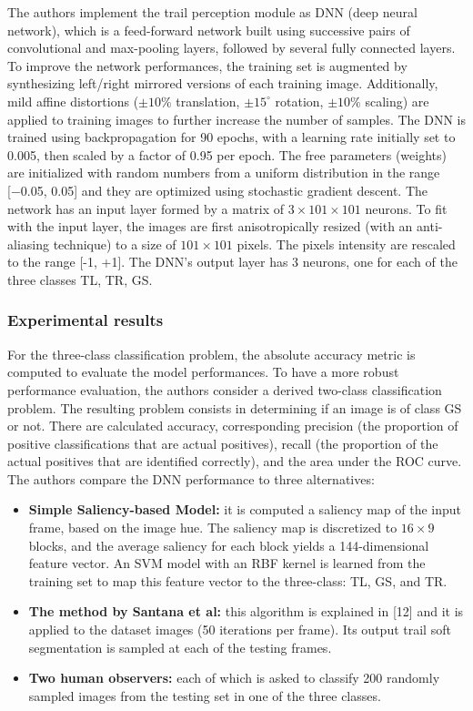 The authors implement the trail perception module as DNN (deep neural
network), which is a feed-forward network built using successive pairs
of convolutional and max-pooling layers, followed by several fully
connected layers. To improve the network performances, the training set
is augmented by synthesizing left/right mirrored versions of each
training image. Additionally, mild affine distortions ($\pm10\%$
translation, $\pm15^{\circ}$ rotation, $\pm10\%$ scaling) are applied to training
images to further increase the number of samples. The DNN is trained
using backpropagation for 90 epochs, with a learning rate initially set
to 0.005, then scaled by a factor of 0.95 per epoch. The free parameters
(weights) are initialized with random numbers from a uniform
distribution in the range {[}−0.05, 0.05{]} and they are optimized using
stochastic gradient descent. The network has an input layer formed by a
matrix of $3 \times 101 \times 101$ neurons. To fit with the input layer, the images
are first anisotropically resized (with an anti-aliasing technique) to a
size of $101 \times 101$ pixels. The pixels intensity are rescaled to the range
{[}-1, +1{]}. The DNN's output layer has 3 neurons, one for each of the
three classes TL, TR, GS.

\subsubsection{Experimental results}\label{header-n72}

For the three-class classification problem, the absolute accuracy metric
is computed to evaluate the model performances. To have a more robust
performance evaluation, the authors consider a derived two-class
classification problem. The resulting problem consists in determining if
an image is of class GS or not. There are calculated accuracy,
corresponding precision (the proportion of positive classifications that
are actual positives), recall (the proportion of the actual positives
that are identified correctly), and the area under the ROC curve. The
authors compare the DNN performance to three alternatives:

\begin{itemize}
\item
  \textbf{Simple Saliency-based Model:} it is computed a saliency map of
  the input frame, based on the image hue. The saliency map is
  discretized to $16 \times 9$ blocks, and the average saliency for each block
  yields a 144-dimensional feature vector. An SVM model with an RBF
  kernel is learned from the training set to map this feature vector to
  the three-class: TL, GS, and TR.
\item
  \textbf{The method by Santana et al:} this algorithm is explained in
  {[}12{]} and it is applied to the dataset images (50 iterations per
  frame). Its output trail soft segmentation is sampled at each of the
  testing frames.
\item
  \textbf{Two human observers:} each of which is asked to classify 200
  randomly sampled images from the testing set in one of the three
  classes.
\end{itemize}

